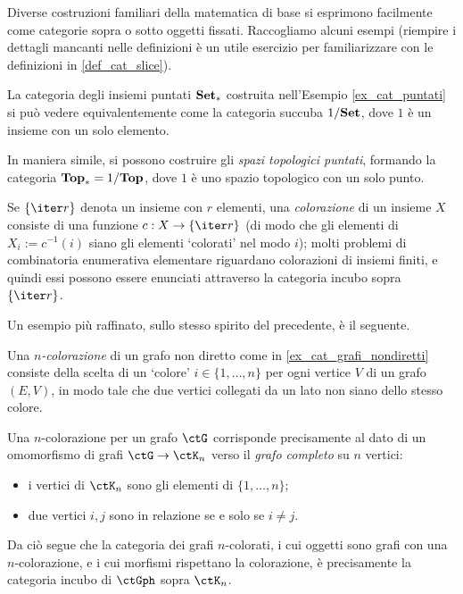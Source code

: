 Diverse costruzioni familiari della matematica di base si esprimono facilmente come categorie sopra o sotto oggetti fissati. Raccogliamo alcuni esempi (riempire i dettagli mancanti nelle definizioni è un utile esercizio per familiarizzare con le definizioni in \ref{def_cat_slice}).
\begin{example}\label{def_spazi_pun_succuba}
	La categoria degli insiemi puntati \(\mathbf{Set}_*\) costruita nell'Esempio \ref{ex_cat_puntati} si può vedere equivalentemente come la categoria succuba \(1/\mathbf{Set}\), dove \(1\) è un insieme con un solo elemento.

	In maniera simile, si possono costruire gli \emph{spazi topologici puntati}, formando la categoria \(\mathbf{Top}_*=1/\mathbf{Top}\), dove \(1\) è uno spazio topologico con un solo punto.
\end{example}
\begin{example}\label{ex_set_colorati}
	Se \(\{\iter r\}\) denota un insieme con \(r\) elementi, una \emph{colorazione} di un insieme \(X\) consiste di una funzione \(c : X \to \{\iter r\}\) (di modo che gli elementi di \(X_i := c^{-1}(i)\) siano gli elementi `colorati' nel modo \(i\)); molti problemi di combinatoria enumerativa elementare riguardano colorazioni di insiemi finiti, e quindi essi possono essere enunciati attraverso la categoria incubo sopra \(\{\iter r\}\).
\end{example}
Un esempio più raffinato, sullo stesso spirito del precedente, è il seguente.
\begin{example}
	Una \emph{$n$-colorazione} di un grafo non diretto come in \ref{ex_cat_grafi_nondiretti} consiste della scelta di un `colore' $i\in\{1,\dots,n\}$ per ogni vertice $V$ di un grafo $(E,V)$, in modo tale che due vertici collegati da un lato non siano dello stesso colore.

	Una $n$-colorazione per un grafo $\ctG$ corrisponde precisamente al dato di un omomorfismo di grafi $\ctG\to\ctK_n$ verso il \emph{grafo completo} su $n$ vertici:
	\begin{itemize}
		\item i vertici di $\ctK_n$ sono gli elementi di $\{1,\dots,n\}$;
		\item due vertici $i,j$ sono in relazione se e solo se $i\ne j$.
	\end{itemize}
	Da ciò segue che la categoria dei grafi $n$-colorati, i cui oggetti sono grafi con una $n$-colorazione, e i cui morfismi rispettano la colorazione, è precisamente la categoria incubo di $\ctGph$ sopra $\ctK_n$. 
\end{example}
